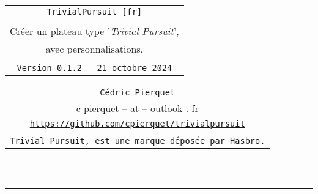 \documentclass[11pt,a4paper]{ltxdoc}
\def\TPversion{0.1.2}
\def\TPdate{21 octobre 2024}
\begin{document}
\pagestyle{fancy}

\thispagestyle{empty}

\begin{center}
	\begin{minipage}{0.88\linewidth}
	\begin{tcolorbox}[colframe=yellow,colback=yellow!15]
		\begin{center}
			\begin{tabular}{c}
				{\Huge \texttt{TrivialPursuit [fr]}}\\
				\\
				{\LARGE Créer un plateau type '\textit{Trivial Pursuit}',} \\
				{\LARGE avec personnalisations.} \\
				\\
				{\small \texttt{Version \TPversion{} -- \TPdate}}
		\end{tabular}
		\end{center}
	\end{tcolorbox}
\end{minipage}
\end{center}

\begin{center}
	\begin{tabular}{c}
	\texttt{Cédric Pierquet}\\
	{\ttfamily c pierquet -- at -- outlook . fr}\\
	\texttt{\url{https://github.com/cpierquet/trivialpursuit}} \\
	\\
	\texttt{Trivial Pursuit\texttrademark, est une marque déposée par Hasbro.}
\end{tabular}
\end{center}

\hrule

\vfill

\begin{tcolorbox}[colframe=lightgray,colback=lightgray!5]
\PlateauTrivialPursuit
\end{tcolorbox}

\vfill~

\pagebreak


\hypertarget{matoc}{}

\tableofcontents

\vspace*{5mm}

\hrule

\vspace*{5mm}
\end{document}

